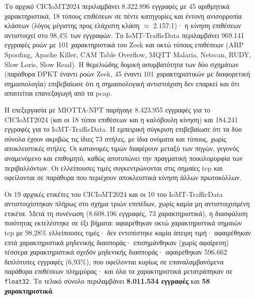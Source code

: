 

Το αρχικό CICIoMT2024 περιλαμβάνει 8.322.896 εγγραφές με 45 αριθμητικά χαρακτηριστικά, 18 τύπους επιθέσεων σε πέντε κατηγορίες και έντονη ανισορροπία κλάσεων (λόγος μέγιστης προς ελάχιστη κλάση $\approx$ 2.157:1)· η κίνηση επιθέσεων αντιστοιχεί στο 98,4\% των εγγραφών. Το IoMT-TrafficData περιλαμβάνει 969.141 εγγραφές ροών με 101 χαρακτηριστικά του Zeek και οκτώ τύπους επιθέσεων (ARP Spoofing, Apache Killer, CAM Table Overflow, MQTT Malaria, Netscan, RUDY, Slow Loris, Slow Read). Η θεμελιώδης δομική ασυμβατότητα των δύο σχημάτων (παράθυρα DPKT έναντι ροών Zeek, 45 έναντι 101 χαρακτηριστικών με διαφορετική σημασιολογία) επιβεβαίωσε ότι η σημασιολογική αντιστοίχιση δεν επαρκεί και ότι απαιτείται επανεξαγωγή από τα \gls{pcap}.


Η επεξεργασία με MIOTTA-NPT παρήγαγε 8.423.955 εγγραφές για το CICIoMT2024 (και οι 18 τύποι επιθέσεων και η καλόβουλη κίνηση) και 184.241 εγγραφές για το IoMT-TrafficData. Η εμπειρική σύγκριση επιβεβαίωσε ότι τα δύο σύνολα έχουν ακριβώς τις ίδιες 73 στήλες, με ίδια ονόματα και τύπους, χωρίς αποκλειστικές στήλες. Οι κατανομές τιμών διαφέρουν μεταξύ των πηγών, γεγονός αναμενόμενο και επιθυμητό, καθώς αποτυπώνει την πραγματική ποικιλομορφία των περιβαλλόντων. Οι ελλείπουσες τιμές συγκεντρώνονται στις σημαίες \gls{tcp} και οφείλονται σε παράθυρα που περιέχουν αποκλειστικά κίνηση άλλων πρωτοκόλλων.


Οι 19 αρχικές ετικέτες του CICIoMT2024 και οι 10 του IoMT-TrafficData αντιστοιχίστηκαν πλήρως στο σχήμα τριών επιπέδων, χωρίς καμία μη αντιστοιχισμένη ετικέτα. Μετά τη συνένωση (8.608.196 εγγραφές, 73 χαρακτηριστικά), η διασφάλιση ποιότητας εκτελέστηκε σε έξι βήματα: αφαιρέθηκαν οκτώ χαρακτηριστικά σημαιών \gls{tcp} με 98,28\% ελλείπουσες τιμές· δεν εντοπίστηκε καμία άπειρη τιμή· αφαιρέθηκαν επτά χαρακτηριστικά μηδενικής διασποράς· επισημάνθηκαν (χωρίς αφαίρεση) τέσσερα χαρακτηριστικά σχεδόν μηδενικής διασποράς· αφαιρέθηκαν 596.662 διπλότυπες εγγραφές (6,93\%), που οφείλονται κυρίως σε επαναλαμβανόμενα παράθυρα επιθέσεων πλημμύρας· και όλα τα χαρακτηριστικά μετατράπηκαν σε \texttt{float32}. Το τελικό σύνολο περιλαμβάνει \textbf{8.011.534 εγγραφές} και \textbf{58 χαρακτηριστικά}.

